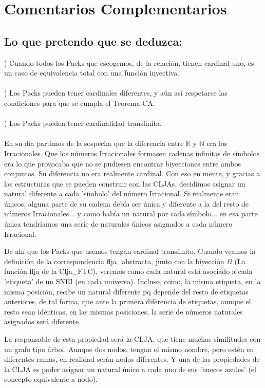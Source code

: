 \chapter[Ordenados por referencias, no por aparición]{Comentarios Complementarios}

\section {Lo que pretendo que se deduzca:}

) Cuando todos los Packs que escogemos, de la relación, tienen cardinal uno, es un caso de equivalencia total con una función inyectiva.\\\\
) Los Packs pueden tener cardinales diferentes, y aún así respetarse las condiciones para que se cumpla el Teorema CA.\\\\
) Los Packs pueden tener cardinalidad transfinita.\\\\

En su día partimos de la sospecha que la diferencia entre $\mathbb{R}$ y $\mathbb{N}$ era los Irracionales. Que los números Irracionales formasen cadenas infinitas de símbolos era lo que provocaba que no se pudiesen encontrar biyecciones entre ambos conjuntos. Su diferencia no era realmente cardinal. Con eso en mente, y gracias a las estructuras que se pueden construir con las CLJAs, decidimos asignar un natural diferente a cada 'símbolo' del número Irracional. Si realmente eran únicos, alguna parte de su cadena debía ser única y diferente a la del resto de números Irracionales... y como había un natural por cada símbolo... en esa parte única tendríamos una serie de naturales únicos asignados a cada número Irracional.

De ahí que los Packs que usemos tengan cardinal transfinito. Cuando veamos la definición de la correspondencia flja\_abstracta, junto con la biyección $\Omega$ (La función flja de la Clja\_FTC), veremos como cada natural está asociado a cada 'etiqueta' de un SNEI (en cada universo). Incluso, como, la misma etiqueta, en la misma posición, recibe un natural diferente pq depende del resto de etiquetas anteriores, de tal forma, que ante la primera diferencia de etiquetas, aunque el resto sean idénticas, en las mismas posiciones, la serie de números naturales asignados será diferente.

La responsable de esta propiedad será la CLJA, que tiene muchas similitudes con un grafo tipo árbol. Aunque dos nodos, tengan el mismo nombre, pero estén en diferentes ramas, en realidad serán nodos diferentes. Y una de las propiedades de la CLJA es poder asignar un natural único a cada uno de sus 'huecos azules' (el concepto equivalente a nodo).

